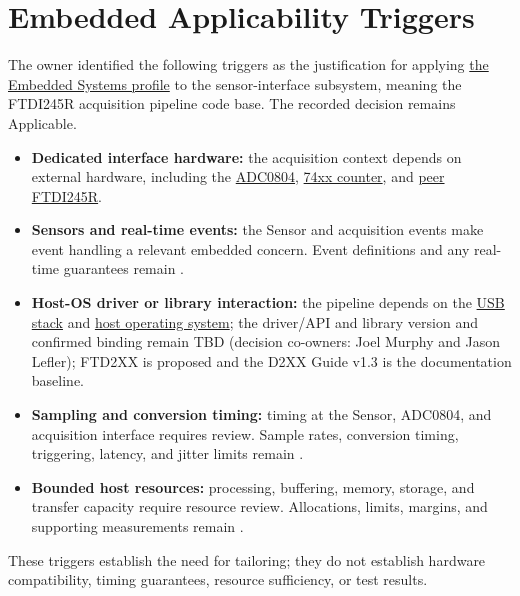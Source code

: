 \section{Embedded Applicability Triggers}
\label{Section:EmbeddedApplicabilityTriggers}
The owner identified the following triggers as the justification for applying
\hyperref[Chapter:EmbeddedSystemsProfile]{the Embedded Systems profile} to
the sensor-interface subsystem, meaning the FTDI245R acquisition pipeline
code base. The recorded decision remains Applicable.
\begin{itemize}
\item \textbf{Dedicated interface hardware:} the acquisition context depends
on external hardware, including the
\hyperref[Dependency:ADC0804]{ADC0804},
\hyperref[Dependency:Counter]{74xx counter}, and
\hyperref[Dependency:PeerFTDI245R]{peer FTDI245R}.
\item \textbf{Sensors and real-time events:} the Sensor and acquisition events
make event handling a relevant embedded concern. Event definitions and any
real-time guarantees remain \OwnedTBD{}.
\item \textbf{Host-OS driver or library interaction:} the pipeline depends on
the \hyperref[Dependency:USBStack]{USB stack} and
\hyperref[Dependency:HostOS]{host operating system}; the driver/API and library
version and confirmed binding remain TBD (decision co-owners: Joel Murphy and Jason Lefler);
FTD2XX is proposed and the D2XX Guide v1.3 is the documentation baseline.
\item \textbf{Sampling and conversion timing:} timing at the Sensor,
ADC0804, and acquisition interface requires review. Sample rates, conversion
timing, triggering, latency, and jitter limits remain \OwnedTBD{}.
\item \textbf{Bounded host resources:} processing, buffering, memory,
storage, and transfer capacity require resource review. Allocations, limits,
margins, and supporting measurements remain \OwnedTBD{}.
\end{itemize}
These triggers establish the need for tailoring; they do not establish
hardware compatibility, timing guarantees, resource sufficiency, or test results.

